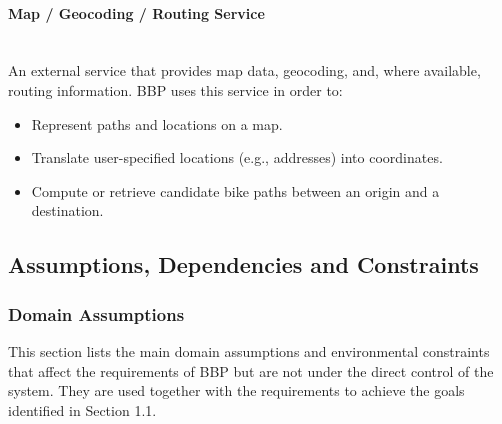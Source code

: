 \paragraph{Map / Geocoding / Routing Service}
\mbox{}\\
An external service that provides map data, geocoding, and, where available, routing information. BBP uses this service in order to:
\begin{itemize}[nosep,leftmargin=1.4em]
    \item Represent paths and locations on a map.
    \item Translate user-specified locations (e.g., addresses) into coordinates.
    \item Compute or retrieve candidate bike paths between an origin and a destination.
\end{itemize}


\subsection{Assumptions, Dependencies and Constraints}
\subsubsection{Domain Assumptions}
This section lists the main domain assumptions and environmental constraints that affect the requirements of BBP but are not under the direct control of the system. 
They are used together with the requirements to achieve the goals identified in Section 1.1. 

